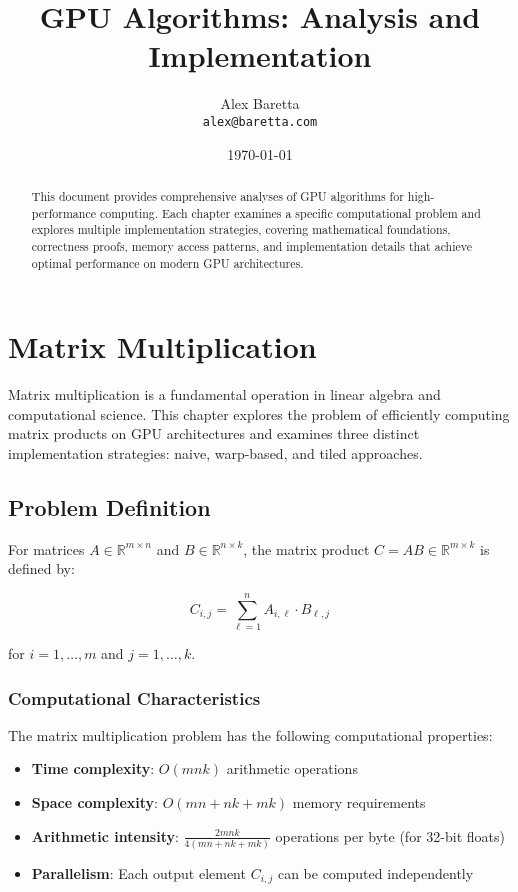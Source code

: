 \documentclass{amsbook}
\title{GPU Algorithms: Analysis and Implementation}
\author{Alex Baretta \\
        \texttt{alex@baretta.com}}
\date{\today}
\theoremstyle{definition}
\begin{document}
\begin{abstract}
This document provides comprehensive analyses of GPU algorithms for high-performance computing. Each chapter examines a specific computational problem and explores multiple implementation strategies, covering mathematical foundations, correctness proofs, memory access patterns, and implementation details that achieve optimal performance on modern GPU architectures.
\end{abstract}

\maketitle

\tableofcontents


\chapter{Matrix Multiplication}

Matrix multiplication is a fundamental operation in linear algebra and computational science. This chapter explores the problem of efficiently computing matrix products on GPU architectures and examines three distinct implementation strategies: naive, warp-based, and tiled approaches.

\section{Problem Definition}

For matrices $A \in \mathbb{R}^{m \times n}$ and $B \in \mathbb{R}^{n \times k}$, the matrix product $C = AB \in \mathbb{R}^{m \times k}$ is defined by:

\begin{equation}
C_{i,j} = \sum_{\ell=1}^{n} A_{i,\ell} \cdot B_{\ell,j}
\end{equation}

for $i = 1, \ldots, m$ and $j = 1, \ldots, k$.

\subsection{Computational Characteristics}

The matrix multiplication problem has the following computational properties:

\begin{itemize}
\item \textbf{Time complexity}: $O(mnk)$ arithmetic operations
\item \textbf{Space complexity}: $O(mn + nk + mk)$ memory requirements
\item \textbf{Arithmetic intensity}: $\frac{2mnk}{4(mn + nk + mk)}$ operations per byte (for 32-bit floats)
\item \textbf{Parallelism}: Each output element $C_{i,j}$ can be computed independently
\end{itemize}
\end{document}
